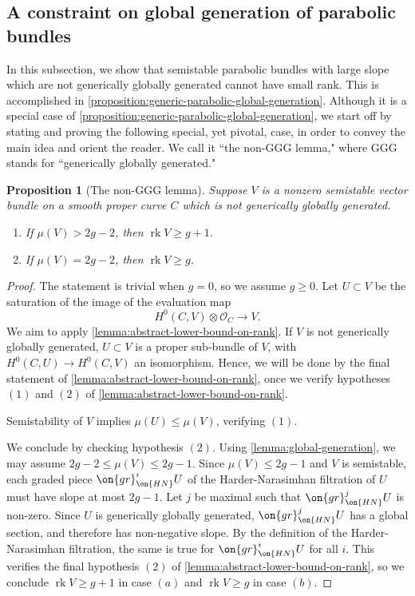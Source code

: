 \documentclass[12 pt]{amsart}
\theoremstyle{plain}
\newtheorem{proposition}[subsubsection]{Proposition}
\theoremstyle{definition}
\theoremstyle{remark}
\numberwithin{equation}{section}
\DeclareMathOperator\rk{rk}
\begin{document}
\subsection{A constraint on global generation of parabolic bundles}

In this subsection, we show that semistable parabolic bundles with large slope which are not generically globally generated cannot have
small rank.
This is accomplished in
\autoref{proposition:generic-parabolic-global-generation}.
Although it is a special case of 
\autoref{proposition:generic-parabolic-global-generation},
we start off by stating and proving the 
following special, yet pivotal, case, in order to convey the main idea and orient the reader. We call it ``the non-GGG lemma," where GGG stands for ``generically globally generated."

\begin{proposition}[The non-GGG lemma]
	\label{proposition:lower-bound-on-rank}
	Suppose $V$ is a nonzero semistable vector bundle on a smooth proper curve $C$
	which is not generically globally generated.
	\begin{enumerate}
		\item[(a)] If $\mu(V) > 2g - 2$, then $\rk V \geq g+1$.
		\item[(b)] If $\mu(V) = 2g-2$, then $\rk V \geq g$.
	\end{enumerate}
\end{proposition}
\begin{proof}
	The statement is trivial when $g =0$, so we assume $g \geq 0$.
	Let $U\subset V$ be the saturation of the image of the evaluation map $$H^0(C, V)\otimes \mathscr{O}_C\to V.$$
	We aim to apply
	\autoref{lemma:abstract-lower-bound-on-rank}.
	If $V$ is not generically globally generated, $U
	\subset V$ is a proper sub-bundle of $V$, with $H^0(C,U) \to H^0(C, V)$
	an isomorphism. Hence, we will be done by the final statement of
	\autoref{lemma:abstract-lower-bound-on-rank}, once we verify
	hypotheses $(1)$ and $(2)$ of
	\autoref{lemma:abstract-lower-bound-on-rank}.

	Semistability of $V$ implies $\mu(U) \leq \mu(V)$, verifying $(1)$.

	We conclude by checking hypothesis $(2)$.
	Using \autoref{lemma:global-generation},
	we may assume $2g-2 \leq \mu(V) \leq 2g - 1$. 
	Since $\mu(V) \leq 2g-1$ and $V$ is semistable, each
	graded piece $\on{gr}^i_{\on{HN}}U$ of the Harder-Narasimhan filtration of $U$ must have slope
	at most $2g-1$. Let $j$ be maximal such that $\on{gr}^j_{\on{HN}}U$ is non-zero. Since $U$ is generically globally generated, $\on{gr}^j_{\on{HN}}U$ has a global section, and therefore has
	non-negative slope. By the definition of the Harder-Narasimhan filtration, the same is true for $\on{gr}^i_{\on{HN}}U$ for all $i$.
	This verifies the final hypothesis $(2)$ of 
	\autoref{lemma:abstract-lower-bound-on-rank}, so we conclude $\rk V \geq
	g + 1$ in case $(a)$ and $\rk V\geq g$ in case $(b)$.
\end{proof}
\end{document}
